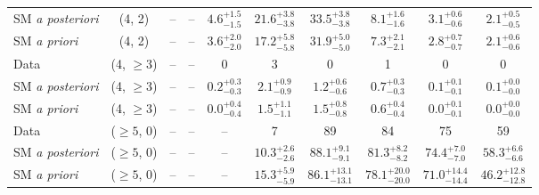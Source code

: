 \begin{table}[h!]
{\begin{tabular}{lccccccccc}
    SM {\it a posteriori} & (4, 2)           & --                            & --                            & $4.6^{+ 1.5 }_{- 1.5 }$     & $21.6^{+ 3.8 }_{- 3.8 }$    & $33.5^{+ 3.8 }_{- 3.8 }$    & $8.1^{+ 1.6 }_{- 1.6 }$     & $3.1^{+ 0.6 }_{- 0.6 }$    & $2.1^{+ 0.5 }_{- 0.5 }$    \\[0.5ex] 
    SM {\it a priori}     & (4, 2)           & --                            & --                            & $3.6^{+ 2.0 }_{- 2.0 }$     & $17.2^{+ 5.8 }_{- 5.8 }$    & $31.9^{+ 5.0 }_{- 5.0 }$    & $7.3^{+ 2.1 }_{- 2.1 }$     & $2.8^{+ 0.7 }_{- 0.7 }$    & $2.1^{+ 0.6 }_{- 0.6 }$    \\[0.5ex] 
    Data                  & (4, $\ge3$)      & --                            & --                            & 0                           & 3                           & 0                           & 1                           & 0                          & 0                          \\[0.5ex] 
    SM {\it a posteriori} & (4, $\ge3$)      & --                            & --                            & $0.2^{+ 0.3 }_{- 0.3 }$     & $2.1^{+ 0.9 }_{- 0.9 }$     & $1.2^{+ 0.6 }_{- 0.6 }$     & $0.7^{+ 0.3 }_{- 0.3 }$     & $0.1^{+ 0.1 }_{- 0.1 }$    & $0.1^{+ 0.0 }_{- 0.0 }$    \\[0.5ex] 
    SM {\it a priori}     & (4, $\ge3$)      & --                            & --                            & $0.0^{+ 0.4 }_{- 0.4 }$     & $1.5^{+ 1.1 }_{- 1.1 }$     & $1.5^{+ 0.8 }_{- 0.8 }$     & $0.6^{+ 0.4 }_{- 0.4 }$     & $0.0^{+ 0.1 }_{- 0.1 }$    & $0.0^{+ 0.0 }_{- 0.0 }$    \\[0.5ex] 
    Data                  & ($\ge5$, 0)      & --                            & --                            & --                          & 7                           & 89                          & 84                          & 75                         & 59                         \\[0.5ex] 
    SM {\it a posteriori} & ($\ge5$, 0)      & --                            & --                            & --                          & $10.3^{+ 2.6 }_{- 2.6 }$    & $88.1^{+ 9.1 }_{- 9.1 }$    & $81.3^{+ 8.2 }_{- 8.2 }$    & $74.4^{+ 7.0 }_{- 7.0 }$   & $58.3^{+ 6.6 }_{- 6.6 }$   \\[0.5ex] 
    SM {\it a priori}     & ($\ge5$, 0)      & --                            & --                            & --                          & $15.3^{+ 5.9 }_{- 5.9 }$    & $86.1^{+ 13.1 }_{- 13.1 }$  & $78.1^{+ 20.0 }_{- 20.0 }$  & $71.0^{+ 14.4 }_{- 14.4 }$ & $46.2^{+ 12.8 }_{- 12.8 }$ \\[0.5ex] 

\end{tabular}}
\end{table}

